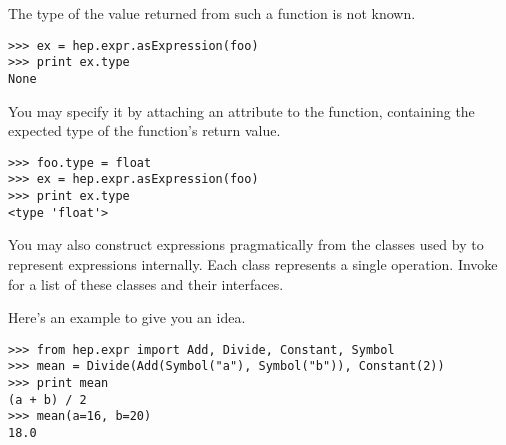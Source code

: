 The type of the value returned from such a function is not known. 
\begin{verbatim}
>>> ex = hep.expr.asExpression(foo)
>>> print ex.type
None
\end{verbatim}
You may specify it by attaching an attribute  to the
function, containing the expected type of the function's return value.
\begin{verbatim}
>>> foo.type = float
>>> ex = hep.expr.asExpression(foo)
>>> print ex.type
<type 'float'>
\end{verbatim}

You may also construct expressions pragmatically from the classes used
by \pyhep to represent expressions internally.  Each class represents a
single operation.  Invoke  for a list of
these classes and their interfaces.

Here's an example to give you an idea.
\begin{verbatim}
>>> from hep.expr import Add, Divide, Constant, Symbol
>>> mean = Divide(Add(Symbol("a"), Symbol("b")), Constant(2))
>>> print mean
(a + b) / 2
>>> mean(a=16, b=20)
18.0
\end{verbatim}


